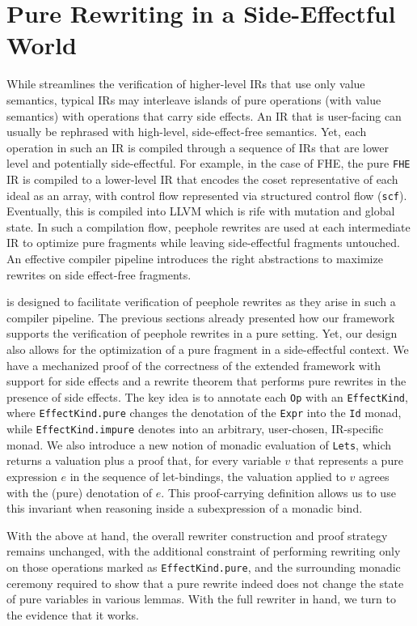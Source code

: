 \section{Pure Rewriting in a Side-Effectful World}
\label{sec:mlir:effects}

While  streamlines the verification of higher-level IRs that use only value semantics, typical IRs may interleave islands of pure operations (with value semantics) with operations that carry side effects.
An IR that is user-facing can usually be rephrased with high-level, side-effect-free semantics.
Yet, each operation in such an IR is compiled through a sequence of IRs that are lower level and potentially side-effectful.
For example, in the case of FHE, the pure \texttt{FHE} IR is compiled to a lower-level IR that encodes the coset representative of each ideal as an array,
with control flow represented via structured control flow (\texttt{scf}).
Eventually, this is compiled into LLVM which is rife with mutation and global state.
In such a compilation flow, peephole rewrites are used at each intermediate IR to optimize pure fragments while leaving side-effectful fragments untouched.
An effective compiler pipeline introduces the right abstractions to maximize rewrites on side effect-free fragments.

 is designed to facilitate verification of peephole rewrites as they arise in such a compiler pipeline.
The previous sections already presented how our framework supports the verification of peephole rewrites in a pure setting.
Yet, our design also allows for the optimization of a pure fragment in a side-effectful context.
We have a mechanized proof of the correctness of the extended framework with support for side effects and a rewrite theorem that performs pure rewrites in the presence of side effects.
The key idea is to annotate each \texttt{Op} with an \texttt{EffectKind}, where \texttt{EffectKind.pure} changes the denotation of the \texttt{Expr} into the \texttt{Id} monad,
while \texttt{EffectKind.impure} denotes into an arbitrary, user-chosen, IR-specific monad.
We also introduce a new notion of monadic evaluation of \texttt{Lets}, which returns a valuation plus a proof that, for every variable $v$ that represents a pure expression $e$ in the sequence of let-bindings, the valuation applied to $v$ agrees with the (pure) denotation of $e$. This proof-carrying definition allows us to use this invariant when reasoning inside a subexpression of a monadic bind.

With the above at hand, the overall rewriter construction and proof strategy remains unchanged,
with the additional constraint of performing rewriting only on those operations marked as \texttt{EffectKind.pure},
and the surrounding monadic ceremony required to show that a pure rewrite indeed does not change the state of pure variables in various lemmas.
With the full rewriter in hand, we turn to the evidence that it works.

